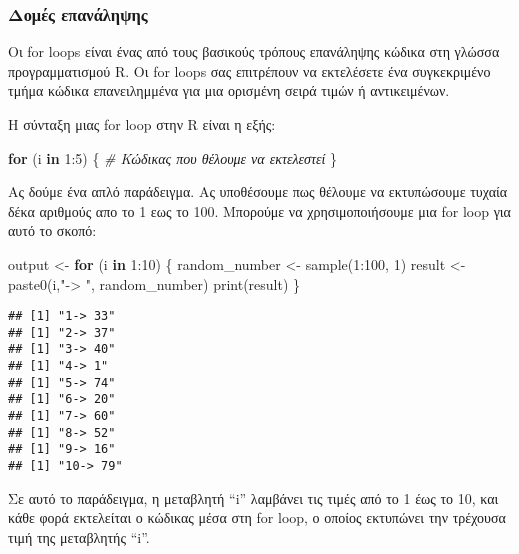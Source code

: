 \documentclass[
]{article}
\newenvironment{Shaded}{\begin{snugshade}}{\end{snugshade}}
\newcommand{\CommentTok}[1]{\textcolor[rgb]{0.56,0.35,0.01}{\textit{#1}}}
\newcommand{\ControlFlowTok}[1]{\textcolor[rgb]{0.13,0.29,0.53}{\textbf{#1}}}
\newcommand{\DecValTok}[1]{\textcolor[rgb]{0.00,0.00,0.81}{#1}}
\newcommand{\FunctionTok}[1]{\textcolor[rgb]{0.00,0.00,0.00}{#1}}
\newcommand{\NormalTok}[1]{#1}
\newcommand{\OtherTok}[1]{\textcolor[rgb]{0.56,0.35,0.01}{#1}}
\newcommand{\SpecialCharTok}[1]{\textcolor[rgb]{0.00,0.00,0.00}{#1}}
\newcommand{\StringTok}[1]{\textcolor[rgb]{0.31,0.60,0.02}{#1}}
\begin{document}
\hypertarget{ux3b4ux3bfux3bcux3adux3c2-ux3b5ux3c0ux3b1ux3bdux3acux3bbux3b7ux3c8ux3b7ux3c2}{%
\subsubsection{Δομές
επανάληψης}\label{ux3b4ux3bfux3bcux3adux3c2-ux3b5ux3c0ux3b1ux3bdux3acux3bbux3b7ux3c8ux3b7ux3c2}}

Οι for loops είναι ένας από τους βασικούς τρόπους επανάληψης κώδικα στη
γλώσσα προγραμματισμού R. Οι for loops σας επιτρέπουν να εκτελέσετε ένα
συγκεκριμένο τμήμα κώδικα επανειλημμένα για μια ορισμένη σειρά τιμών ή
αντικειμένων.

Η σύνταξη μιας for loop στην R είναι η εξής:

\begin{Shaded}
\begin{Highlighting}[]
\ControlFlowTok{for}\NormalTok{ (i }\ControlFlowTok{in} \DecValTok{1}\SpecialCharTok{:}\DecValTok{5}\NormalTok{) \{}
  \CommentTok{\# Κώδικας που θέλουμε να εκτελεστεί}
\NormalTok{\}}
\end{Highlighting}
\end{Shaded}

Ας δούμε ένα απλό παράδειγμα. Aς υποθέσουμε πως θέλουμε να εκτυπώσουμε
τυχαία δέκα αριθμούς απο το 1 εως το 100. Μπορούμε να χρησιμοποιήσουμε
μια for loop για αυτό το σκοπό:

\begin{Shaded}
\begin{Highlighting}[]
\NormalTok{output }\OtherTok{\textless{}{-}} \ControlFlowTok{for}\NormalTok{ (i }\ControlFlowTok{in} \DecValTok{1}\SpecialCharTok{:}\DecValTok{10}\NormalTok{) \{}
\NormalTok{  random\_number }\OtherTok{\textless{}{-}} \FunctionTok{sample}\NormalTok{(}\DecValTok{1}\SpecialCharTok{:}\DecValTok{100}\NormalTok{, }\DecValTok{1}\NormalTok{)}
\NormalTok{  result }\OtherTok{\textless{}{-}} \FunctionTok{paste0}\NormalTok{(i,}\StringTok{"{-}\textgreater{} "}\NormalTok{, random\_number)}
  \FunctionTok{print}\NormalTok{(result)}
\NormalTok{\}}
\end{Highlighting}
\end{Shaded}

\begin{verbatim}
## [1] "1-> 33"
## [1] "2-> 37"
## [1] "3-> 40"
## [1] "4-> 1"
## [1] "5-> 74"
## [1] "6-> 20"
## [1] "7-> 60"
## [1] "8-> 52"
## [1] "9-> 16"
## [1] "10-> 79"
\end{verbatim}

Σε αυτό το παράδειγμα, η μεταβλητή ``i'' λαμβάνει τις τιμές από το 1 έως
το 10, και κάθε φορά εκτελείται ο κώδικας μέσα στη for loop, ο οποίος
εκτυπώνει την τρέχουσα τιμή της μεταβλητής ``i''.
\end{document}
